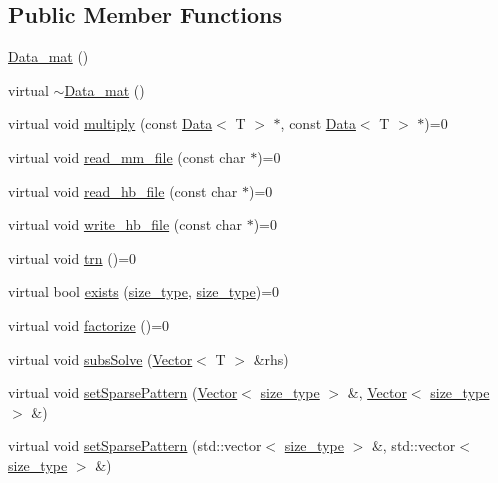 \subsection*{Public Member Functions}
\begin{DoxyCompactItemize}
\item 
\hyperlink{classlmx_1_1Data__mat_a03e90b0b3053c99ef6d2e183d763511e}{Data\-\_\-mat} ()
\item 
virtual \hyperlink{classlmx_1_1Data__mat_a0c57d9772b2eccf6f796e60f1e156964}{$\sim$\-Data\-\_\-mat} ()
\item 
virtual void \hyperlink{classlmx_1_1Data__mat_a850c5fadc5139992f32bf15316309b52}{multiply} (const \hyperlink{classlmx_1_1Data}{Data}$<$ T $>$ $\ast$, const \hyperlink{classlmx_1_1Data}{Data}$<$ T $>$ $\ast$)=0
\item 
virtual void \hyperlink{classlmx_1_1Data__mat_afd492bb04f83b8b96b5964834436290a}{read\-\_\-mm\-\_\-file} (const char $\ast$)=0
\item 
virtual void \hyperlink{classlmx_1_1Data__mat_add96428335bb5119c7f5126ebb07fb10}{read\-\_\-hb\-\_\-file} (const char $\ast$)=0
\item 
virtual void \hyperlink{classlmx_1_1Data__mat_adbbffb805ce19ca7e9d2a2f70d0f7bcd}{write\-\_\-hb\-\_\-file} (const char $\ast$)=0
\item 
virtual void \hyperlink{classlmx_1_1Data__mat_aace5fad359799ebcd14dd79c458b340e}{trn} ()=0
\item 
virtual bool \hyperlink{classlmx_1_1Data__mat_aec8ef2dab6c85ad0461718eb2aafe6ae}{exists} (\hyperlink{lmx__mat__data_8h_a49b489a408a211a90e766329c0732d7b}{size\-\_\-type}, \hyperlink{lmx__mat__data_8h_a49b489a408a211a90e766329c0732d7b}{size\-\_\-type})=0
\item 
virtual void \hyperlink{classlmx_1_1Data__mat_a1b94e36086c4c181f8001f277ed89bbf}{factorize} ()=0
\item 
virtual void \hyperlink{classlmx_1_1Data__mat_a8401959d4f7f008144de038293e24d5e}{subs\-Solve} (\hyperlink{classlmx_1_1Vector}{Vector}$<$ T $>$ \&rhs)
\item 
virtual void \hyperlink{classlmx_1_1Data__mat_ac599c952372bc78b03c01ed4c7ed5094}{set\-Sparse\-Pattern} (\hyperlink{classlmx_1_1Vector}{Vector}$<$ \hyperlink{lmx__mat__data_8h_a49b489a408a211a90e766329c0732d7b}{size\-\_\-type} $>$ \&, \hyperlink{classlmx_1_1Vector}{Vector}$<$ \hyperlink{lmx__mat__data_8h_a49b489a408a211a90e766329c0732d7b}{size\-\_\-type} $>$ \&)
\item 
virtual void \hyperlink{classlmx_1_1Data__mat_a58692a61f0d7b7c5c74225800a30da91}{set\-Sparse\-Pattern} (std\-::vector$<$ \hyperlink{lmx__mat__data_8h_a49b489a408a211a90e766329c0732d7b}{size\-\_\-type} $>$ \&, std\-::vector$<$ \hyperlink{lmx__mat__data_8h_a49b489a408a211a90e766329c0732d7b}{size\-\_\-type} $>$ \&)
\end{DoxyCompactItemize}


